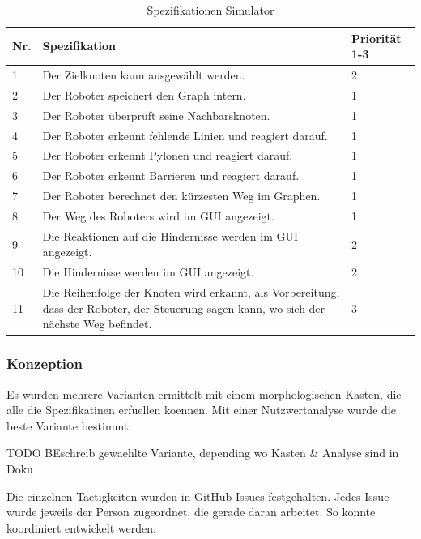 \begin{table}[H]
\centering
\small
\begin{tabularx}{\textwidth}{|l|X|l|}
\hline
  \textbf{Nr.} & \textbf{Spezifikation} & \textbf{Priorität 1-3}  \\
  \hline
  1  & Der Zielknoten kann ausgewählt werden. &  2\\
  \hline
   2   & Der Roboter speichert den Graph intern.  & 1\\
  \hline
   3 & Der Roboter überprüft seine Nachbarsknoten.&1\\
  \hline
  4 & Der Roboter erkennt fehlende Linien und reagiert darauf. & 1\\
  \hline
  5 &   Der Roboter erkennt Pylonen und reagiert darauf. & 1\\
  \hline
   6  &   Der Roboter erkennt Barrieren und reagiert darauf. & 1\\
  \hline
    7 &   Der Roboter berechnet den kürzesten Weg im Graphen.& 1\\
  \hline
     8  &   Der Weg des Roboters wird im GUI angezeigt. & 1\\
  \hline
      9   &   Die Reaktionen auf die Hindernisse werden im GUI angezeigt. & 2\\
  \hline
 10   &   Die Hindernisse werden im GUI angezeigt. & 2\\
  \hline
   11   &   Die Reihenfolge der Knoten wird erkannt, als Vorbereitung, dass der Roboter, der Steuerung sagen kann, wo sich der nächste Weg befindet. & 3\\
  \hline

\end{tabularx}
\caption{Spezifikationen Simulator}
\label{table:spezifikation-simulator}
\end{table}

\subsubsection{Konzeption}

Es wurden mehrere Varianten ermittelt mit einem morphologischen Kasten, die alle die Spezifikatinen erfuellen koennen. Mit einer Nutzwertanalyse wurde die beste Variante bestimmt.

TODO BEschreib gewaehlte Variante, depending wo Kasten \& Analyse sind in Doku

Die einzelnen Taetigkeiten wurden in GitHub Issues festgehalten. Jedes Issue wurde jeweils der Person zugeordnet, die gerade daran arbeitet. So konnte koordiniert entwickelt werden.


